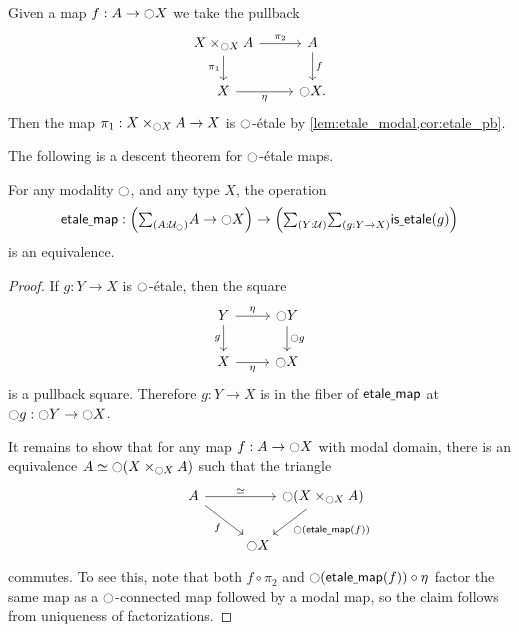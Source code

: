 \documentclass[9pt,twosided]{amsart}
\begin{document}
\begin{constr}
Given a map $f:A\to {\ensuremath{\ocircle}} X$ we take the pullback
\begin{equation*}
\begin{tikzcd}
X\times_{\modal X}A \arrow[d,swap,"\pi_1"] \arrow[r,"\pi_2"] & A \arrow[d,"f"] \\
X \arrow[r,swap,"\modalunit"] & \modal X.
\end{tikzcd}
\end{equation*}
Then the map $\pi_1:X\times_{{\ocircle} X}A\to X$ is ${\ocircle}$-\'etale by \cref{lem:etale_modal,cor:etale_pb}.
\end{constr}

The following is a descent theorem for ${\ocircle}$-\'etale maps.

\begin{thm}\label{thm:modal_descent}
For any modality ${\ocircle}$, and any type $X$, the operation
\begin{equation*}
\etmap:\Big(\sm{A:\UU_\modal}A\to\modal X\Big)\to\Big(\sm{Y:\UU}{g:Y\to X}\isetale(g)\Big)
\end{equation*}
is an equivalence.
\end{thm}

\begin{proof}
If $g:Y\to X$ is ${\ocircle}$-\'etale, then the square
\begin{equation*}
\begin{tikzcd}
Y \arrow[d,swap,"g"] \arrow[r,"\modalunit"] & \modal Y \arrow[d,"\modal g"] \\
X \arrow[r,swap,"\modalunit"] & \modal X
\end{tikzcd}
\end{equation*}
is a pullback square. Therefore $g:Y\to X$ is in the fiber of $\mathsf{etale\underline{\ }{}map}$ at ${\ocircle} g : {\ocircle} Y\to{\ensuremath{\ocircle}} X$. 

It remains to show that for any map $f:A\to{\ensuremath{\ocircle}} X$ with modal domain, there is an equivalence $\eqv{A}{\modal (X\times_{\modal X} A)}$ such that the triangle
\begin{equation*}
\begin{tikzcd}[column sep=0]
A \arrow[dr,swap,"f"] \arrow[rr,"\eqvsym"] & & \modal (X\times_{\modal X} A) \arrow[dl,"\modal(\etmap(f))"] \\
\phantom{\modal (X\times_{\modal X} A)} & \modal X
\end{tikzcd}
\end{equation*}
commutes. To see this, note that both $f\circ \pi_2$ and ${\ocircle}(\mathsf{etale\underline{\ }{}map}(f))\circ {\eta_{}}$ factor the same map as a ${\ocircle}$-connected map followed by a modal map, so the claim follows from uniqueness of factorizations.
\end{proof}
\end{document}
